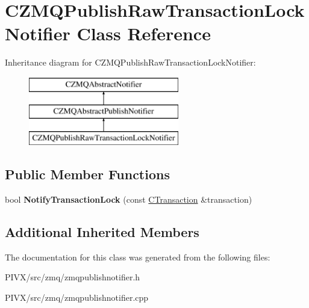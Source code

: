 \hypertarget{class_c_z_m_q_publish_raw_transaction_lock_notifier}{}\section{C\+Z\+M\+Q\+Publish\+Raw\+Transaction\+Lock\+Notifier Class Reference}
\label{class_c_z_m_q_publish_raw_transaction_lock_notifier}
Inheritance diagram for C\+Z\+M\+Q\+Publish\+Raw\+Transaction\+Lock\+Notifier\+:\begin{figure}[H]
\begin{center}
\leavevmode
\includegraphics[height=3.000000cm]{class_c_z_m_q_publish_raw_transaction_lock_notifier}
\end{center}
\end{figure}
\subsection*{Public Member Functions}
\begin{DoxyCompactItemize}
\item 
\mbox{\label{class_c_z_m_q_publish_raw_transaction_lock_notifier_a54b6dd2bd22f859ac8eca3585d906416}} 
bool {\bfseries Notify\+Transaction\+Lock} (const \mbox{\hyperlink{class_c_transaction}{C\+Transaction}} \&transaction)
\end{DoxyCompactItemize}
\subsection*{Additional Inherited Members}


The documentation for this class was generated from the following files\+:\begin{DoxyCompactItemize}
\item 
P\+I\+V\+X/src/zmq/zmqpublishnotifier.\+h\item 
P\+I\+V\+X/src/zmq/zmqpublishnotifier.\+cpp\end{DoxyCompactItemize}
